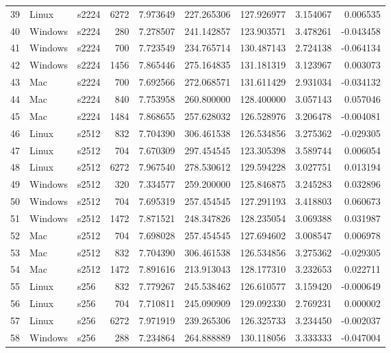 \documentclass{IEEEtran}
\begin{document}
\begin{longtable}{rllrrrrrr}
  39 & Linux & s2224 &    6272 & 7.973649 & 227.265306 & 127.926977 & 3.154067 & 0.006535 \\ 
  40 & Windows & s2224 &     280 & 7.278507 & 241.142857 & 123.903571 & 3.478261 & -0.043458 \\ 
  41 & Windows & s2224 &     700 & 7.723549 & 234.765714 & 130.487143 & 2.724138 & -0.064134 \\ 
  42 & Windows & s2224 &    1456 & 7.865446 & 275.164835 & 131.181319 & 3.123967 & 0.003073 \\ 
  43 & Mac & s2224 &     700 & 7.692566 & 272.068571 & 131.611429 & 2.931034 & -0.034132 \\ 
  44 & Mac & s2224 &     840 & 7.753958 & 260.800000 & 128.400000 & 3.057143 & 0.057046 \\ 
  45 & Mac & s2224 &    1484 & 7.868655 & 257.628032 & 126.528976 & 3.206478 & -0.004081 \\ 
  46 & Linux & s2512 &     832 & 7.704390 & 306.461538 & 126.534856 & 3.275362 & -0.029305 \\ 
  47 & Linux & s2512 &     704 & 7.670309 & 297.454545 & 123.305398 & 3.589744 & 0.006054 \\ 
  48 & Linux & s2512 &    6272 & 7.967540 & 278.530612 & 129.594228 & 3.027751 & 0.013194 \\ 
  49 & Windows & s2512 &     320 & 7.334577 & 259.200000 & 125.846875 & 3.245283 & 0.032896 \\ 
  50 & Windows & s2512 &     704 & 7.695319 & 257.454545 & 127.291193 & 3.418803 & 0.060673 \\ 
  51 & Windows & s2512 &    1472 & 7.871521 & 248.347826 & 128.235054 & 3.069388 & 0.031987 \\ 
  52 & Mac & s2512 &     704 & 7.698028 & 257.454545 & 127.694602 & 3.008547 & 0.006978 \\ 
  53 & Mac & s2512 &     832 & 7.704390 & 306.461538 & 126.534856 & 3.275362 & -0.029305 \\ 
  54 & Mac & s2512 &    1472 & 7.891616 & 213.913043 & 128.177310 & 3.232653 & 0.022711 \\ 
  55 & Linux & s256 &     832 & 7.779267 & 245.538462 & 126.610577 & 3.159420 & -0.000649 \\ 
  56 & Linux & s256 &     704 & 7.710811 & 245.090909 & 129.092330 & 2.769231 & 0.000002 \\ 
  57 & Linux & s256 &    6272 & 7.971919 & 239.265306 & 126.325733 & 3.234450 & -0.002037 \\ 
  58 & Windows & s256 &     288 & 7.234864 & 264.888889 & 130.118056 & 3.333333 & -0.047004 \\ 

\end{longtable}
\end{document}

